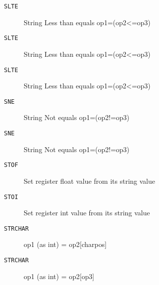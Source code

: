 
\begin{description}
\item[\texttt{SLTE       }]  String Less than equals op1=(op2<=op3)\\
\end{description}

\begin{description}
\item[\texttt{SLTE       }]  String Less than equals op1=(op2<=op3)\\
\end{description}

\begin{description}
\item[\texttt{SLTE       }]  String Less than equals op1=(op2<=op3)\\
\end{description}

\begin{description}
\item[\texttt{SNE        }]  String Not equals op1=(op2!=op3)\\
\end{description}

\begin{description}
\item[\texttt{SNE        }]  String Not equals op1=(op2!=op3)\\
\end{description}

\begin{description}
\item[\texttt{STOF       }]  Set register float value from its string value\\
\end{description}

\begin{description}
\item[\texttt{STOI       }]  Set register int value from its string value\\
\end{description}

\begin{description}
\item[\texttt{STRCHAR    }]  op1 (as int) = op2[charpos]\\
\end{description}

\begin{description}
\item[\texttt{STRCHAR    }]  op1 (as int) = op2[op3]\\
\end{description}
